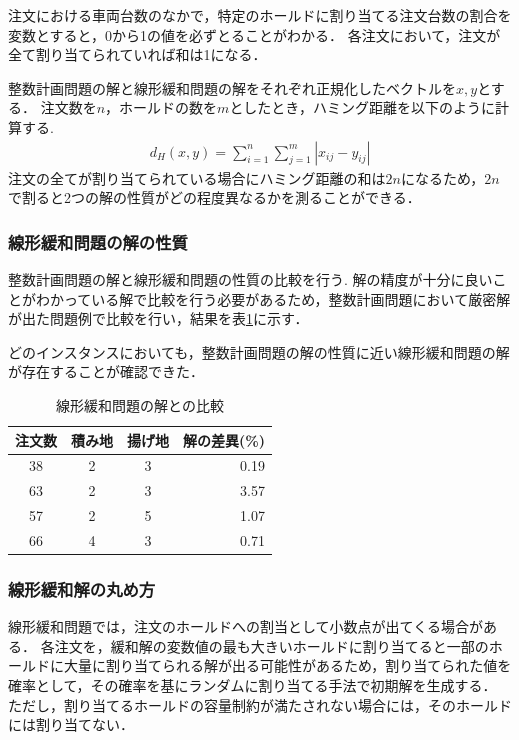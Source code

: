 注文における車両台数のなかで，特定のホールドに割り当てる注文台数の割合を変数とすると，0から1の値を必ずとることがわかる．
各注文において，注文が全て割り当てられていれば和は1になる．

整数計画問題の解と線形緩和問題の解をそれぞれ正規化したベクトルを$x,y$とする．
注文数を$n$，ホールドの数を$m$としたとき，ハミング距離を以下のように計算する.
\begin{align*}
 d_H(x,y) =\sum_{i=1}^n \sum_{j=1}^m|x_{ij}-y_{ij}|
\end{align*}
注文の全てが割り当てられている場合にハミング距離の和は$2n$になるため，$2n$で割ると2つの解の性質がどの程度異なるかを測ることができる．


\subsubsection{線形緩和問題の解の性質}
整数計画問題の解と線形緩和問題の性質の比較を行う.
解の精度が十分に良いことがわかっている解で比較を行う必要があるため，整数計画問題において厳密解が出た問題例で比較を行い，結果を表\ref{hamming}に示す．

どのインスタンスにおいても，整数計画問題の解の性質に近い線形緩和問題の解が存在することが確認できた．

\begin{table}[h]
  \centering
  \caption{線形緩和問題の解との比較}
  \label{hamming}
\begin{tabular}{cccr}
\hline
注文数 & 積み地 & 揚げ地 & \multicolumn{1}{c}{解の差異(\%)} \\ \hline
38 & 2   & 3   & 0.19                        \\
63 & 2   & 3   & 3.57                         \\
57 & 2   & 5   & 1.07                         \\
66 & 4   & 3   & 0.71                        \\ \hline
\end{tabular}
\end{table}

\subsubsection{線形緩和解の丸め方}
線形緩和問題では，注文のホールドへの割当として小数点が出てくる場合がある．
各注文を，緩和解の変数値の最も大きいホールドに割り当てると一部のホールドに大量に割り当てられる解が出る可能性があるため，割り当てられた値を確率として，その確率を基にランダムに割り当てる手法で初期解を生成する．
ただし，割り当てるホールドの容量制約が満たされない場合には，そのホールドには割り当てない．


